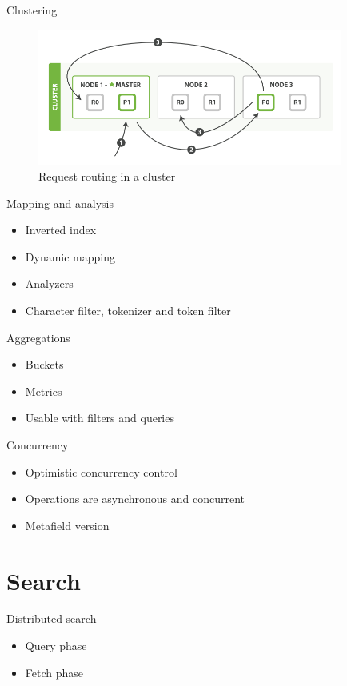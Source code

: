 \documentclass[10pt]{beamer}
\begin{document}
\begin{frame}{Clustering}
	\begin{figure}
		\centering\includegraphics[width=10cm]{cluster_data}
		\caption{Request routing in a cluster}
	\end{figure}
\end{frame}

\begin{frame}{Mapping and analysis}
	\begin{itemize}
		\item Inverted index
		\item Dynamic mapping
		\item Analyzers
		\item Character filter, tokenizer and token filter
	\end{itemize}
\end{frame}

\begin{frame}{Aggregations}
	\begin{itemize}
		\item Buckets
		\item Metrics
		\item Usable with filters and queries
	\end{itemize}
\end{frame}

\begin{frame}{Concurrency}
	\begin{itemize}
		\item Optimistic concurrency control
		\item Operations are asynchronous and concurrent
		\item Metafield version
	\end{itemize}
\end{frame}


\section{Search}

\begin{frame}{Distributed search}
	\begin{itemize}
		\item Query phase
		\item Fetch phase
	\end{itemize}
\end{frame}
\end{document}
